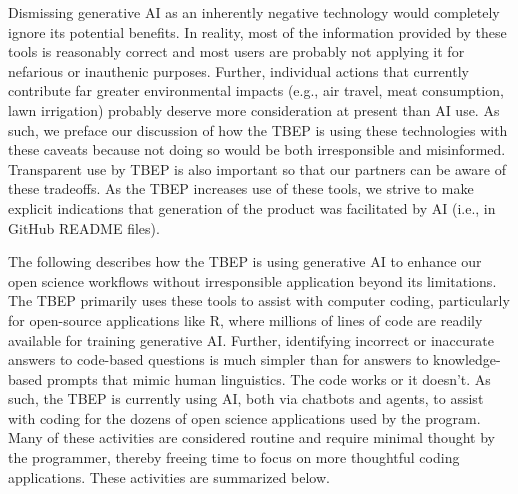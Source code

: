 \documentclass[
]{book}
\begin{document}
Dismissing generative AI as an inherently negative technology would completely ignore its potential benefits. In reality, most of the information provided by these tools is reasonably correct and most users are probably not applying it for nefarious or inauthenic purposes. Further, individual actions that currently contribute far greater environmental impacts (e.g., air travel, meat consumption, lawn irrigation) probably deserve more consideration at present than AI use. As such, we preface our discussion of how the TBEP is using these technologies with these caveats because not doing so would be both irresponsible and misinformed. Transparent use by TBEP is also important so that our partners can be aware of these tradeoffs. As the TBEP increases use of these tools, we strive to make explicit indications that generation of the product was facilitated by AI (i.e., in GitHub README files).

The following describes how the TBEP is using generative AI to enhance our open science workflows without irresponsible application beyond its limitations. The TBEP primarily uses these tools to assist with computer coding, particularly for open-source applications like R, where millions of lines of code are readily available for training generative AI. Further, identifying incorrect or inaccurate answers to code-based questions is much simpler than for answers to knowledge-based prompts that mimic human linguistics. The code works or it doesn't. As such, the TBEP is currently using AI, both via chatbots and agents, to assist with coding for the dozens of open science applications used by the program. Many of these activities are considered routine and require minimal thought by the programmer, thereby freeing time to focus on more thoughtful coding applications. These activities are summarized below.
\end{document}
